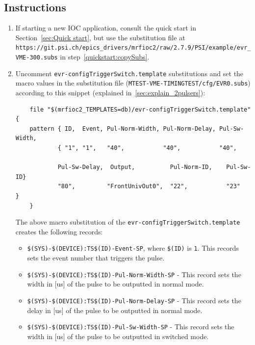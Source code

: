 \documentclass[12pt,a4paper]{article}
\newcommand{\latestDriverVersion}{2.7.9}
\begin{document}
\subsection{Instructions}
\begin{enumerate}
	\item If starting a new IOC application, consult the quick start in Section~\ref{sec:Quick start}, but use the substitution file at \texttt{https://git.psi.ch/epics\_drivers/}\newline \texttt{mrfioc2/raw/\latestDriverVersion/PSI/example/evr\_VME-300.subs} in step~\ref{quickstart:copySubs}.

	\item Uncomment \texttt{evr-configTriggerSwitch.template} substitutions and set the macro values in the substitution file \newline(\texttt{MTEST-VME-TIMINGTEST/cfg/EVR0.subs}) according to this snippet (explained in~\ref{sec:explain_2pulsers}):
\begin{verbatim}
	file "$(mrfioc2_TEMPLATES=db)/evr-configTriggerSwitch.template"{
	pattern { ID,  Event, Pul-Norm-Width, Pul-Norm-Delay, Pul-Sw-Width,
	        { "1", "1",   "40",           "40",           "40",            
      
	        Pul-Sw-Delay,  Output,          Pul-Norm-ID,    Pul-Sw-ID}
	        "80",         "FrontUnivOut0",  "22",           "23"     }
	}
\end{verbatim}
	The above macro substitution of the \texttt{evr-configTriggerSwitch.template} creates the following records:
	\begin{itemize}
		\item \texttt{\$(SYS)-\$(DEVICE):TS\$(ID)-Event-SP}, where \texttt{\$(ID)} is \texttt{1}. This records sets the event number that triggers the pulse.
		
		\item \texttt{\$(SYS)-\$(DEVICE):TS\$(ID)-Pul-Norm-Width-SP} - This record sets the width in [us] of the pulse to be outputted in normal mode. 
		
		\item \texttt{\$(SYS)-\$(DEVICE):TS\$(ID)-Pul-Norm-Delay-SP} - This record sets the delay in [us] of the pulse to be outputted in normal mode. 
		
		\item \texttt{\$(SYS)-\$(DEVICE):TS\$(ID)-Pul-Sw-Width-SP} - This record sets the width in [us] of the pulse to be outputted in switched mode.
		

\end{itemize}
\end{enumerate}
\end{document}
